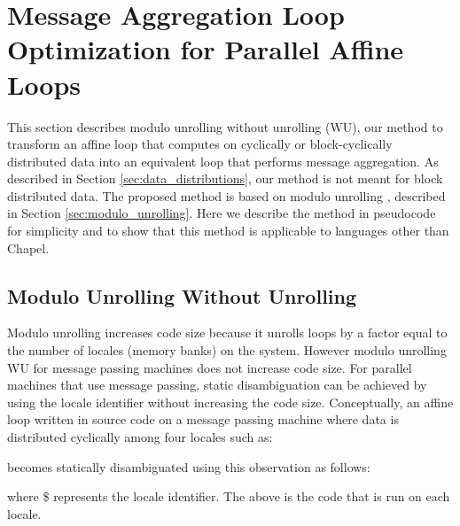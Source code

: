 \section{Message Aggregation Loop Optimization for Parallel Affine Loops}\label{sec:transformation} 

This section describes modulo unrolling without unrolling (WU), our method to transform an affine loop that computes on cyclically or block-cyclically distributed data into an equivalent loop that performs message aggregation. As described in Section \ref{sec:data_distributions}, our method is not meant for block distributed data. The proposed method is based on modulo unrolling \cite{barua1999maps}, described in Section \ref{sec:modulo_unrolling}. Here we describe the method in pseudocode for simplicity and to show that this method is applicable to languages other than Chapel. 

\subsection{Modulo Unrolling Without Unrolling}\label{subsec:modulo_unrolling_without_unrolling}

Modulo unrolling increases code size because it unrolls loops by a factor equal to the number of locales (memory banks) on the system. However modulo unrolling WU for message passing machines does not increase code size. For parallel machines that use message passing, static disambiguation can be achieved by using the locale identifier without increasing the code size. Conceptually, an affine loop written in source code on a message passing machine where data is distributed cyclically among four locales such as:\newline



\tab{\texttt{\}}}\newline

becomes statically disambiguated using this observation as follows:\newline



\tab{\texttt{\}}}\newline

where \$ represents the locale identifier. The above is the code that is run on each locale.

